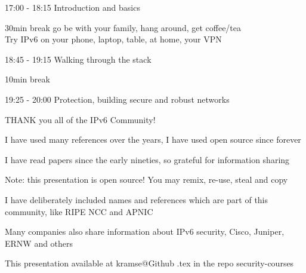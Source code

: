 \documentclass[Screen16to9,17pt]{foils}
\begin{document}


\begin{list2}
\item 17:00 - 18:15  Introduction and basics\\

\item 30min break  go be with your family, hang around, get coffee/tea\\
Try IPv6 on your phone, laptop, table, at home, your VPN

\item 18:45 - 19:15 Walking through the stack\\

\item 10min break\\

\item 19:25 - 20:00 Protection, building secure and robust networks\\

\end{list2}

\hlkprofiluk


\slide{}


\vskip 5mm
\centerline{{\color{red}\faHeart} THANK you all of the IPv6 Community! {\color{red}\faHeart}}

\begin{list2}
\item I have used many references over the years, I have used open source since forever
\item I have read papers since the early nineties, so grateful for information sharing
\item Note: this presentation is open source! You may remix, re-use, steal and copy
\item I have deliberately included names and references which are part of this community, like RIPE NCC and APNIC
\item Many companies also share information about IPv6 security, Cisco, Juniper, ERNW and others
\item This presentation available at kramse@Github \jobname.tex in the repo security-courses
\end{list2}
\end{document}
